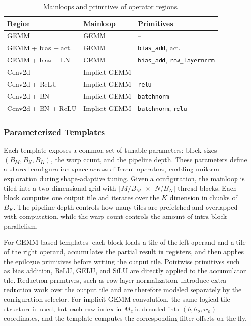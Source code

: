 \begin{table}[H]
  \centering
  \caption{Mainloops and primitives of operator regions.}
  \label{tab:template-mapping}
  \small
  \begin{tabularx}{\linewidth}{l l X}
    \toprule
    Region & Mainloop & Primitives \\
    \midrule
    GEMM & GEMM & -- \\
    GEMM + bias + act. & GEMM & \texttt{bias\_add}, act. \\
    GEMM + bias + LN & GEMM & \texttt{bias\_add}, \texttt{row\_layernorm} \\
    Conv2d & Implicit GEMM & -- \\
    Conv2d + ReLU & Implicit GEMM & \texttt{relu} \\
    Conv2d + BN & Implicit GEMM & \texttt{batchnorm} \\
    Conv2d + BN + ReLU & Implicit GEMM & \texttt{batchnorm}, \texttt{relu} \\
    \bottomrule
  \end{tabularx}
\end{table}

\subsubsection{Parameterized Templates}
Each template exposes a common set of tunable parameters: block sizes
$(B_M,B_N,B_K)$, the warp count, and the pipeline depth. 
These parameters define a shared configuration space across different operators, 
enabling uniform exploration during shape-adaptive tuning.
Given a configuration, the mainloop is tiled into a two dimensional grid with
$\lceil M / B_M \rceil \times
 \lceil N / B_N \rceil$
thread blocks.  Each block computes one output tile and iterates over the
$K$ dimension in chunks of $B_K$.  The pipeline depth controls how many tiles
are prefetched and overlapped with computation, while the warp count controls
the amount of intra-block parallelism.

For GEMM-based templates, each block loads a tile of the left operand and a
tile of the right operand, accumulates the partial result in registers, and
then applies the epilogue primitives before writing the output tile.  Pointwise
primitives such as bias addition, ReLU, GELU, and SiLU are directly applied to
the accumulator tile.  Reduction primitives, such as row layer normalization,
introduce extra reduction work over the output tile and are therefore modeled
separately by the configuration selector. For implicit-GEMM convolution, the
same logical tile structure is used, but each row index in $M_c$ is
decoded into $(b,h_o,w_o)$ coordinates, and the template computes the
corresponding filter offsets on the fly.

